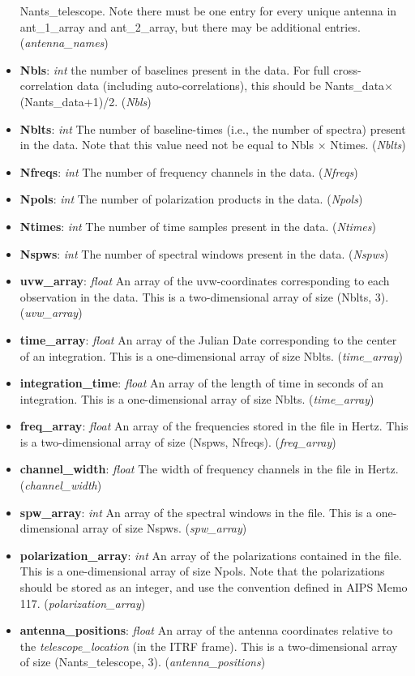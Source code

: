 \documentclass[11pt, oneside]{article}
\begin{document}
\begin{itemize}
  Nants\_telescope. Note there must be one entry for every unique antenna in
  ant\_1\_array and ant\_2\_array, but there may be additional
  entries. (\textit{antenna\_names})
\item \textbf{Nbls}: \textit{int} the number of baselines present in the
  data. For full cross-correlation data (including auto-correlations), this
  should be Nants\_data$\times$(Nants\_data+1)/2. (\textit{Nbls})
\item \textbf{Nblts}: \textit{int} The number of baseline-times (i.e., the
  number of spectra) present in the data. Note that this value need not be equal
  to Nbls $\times$ Ntimes. (\textit{Nblts})
\item \textbf{Nfreqs}: \textit{int} The number of frequency channels in the
  data. (\textit{Nfreqs})
\item \textbf{Npols}: \textit{int} The number of polarization products in the
  data. (\textit{Npols})
\item \textbf{Ntimes}: \textit{int} The number of time samples present in the
  data. (\textit{Ntimes})
\item \textbf{Nspws}: \textit{int} The number of spectral windows present in the
  data. (\textit{Nspws})
\item \textbf{uvw\_array}: \textit{float} An array of the uvw-coordinates
  corresponding to each observation in the data. This is a two-dimensional array of
  size (Nblts, 3). (\textit{uvw\_array})
\item \textbf{time\_array}: \textit{float} An array of the Julian Date
  corresponding to the center of an integration. This is a one-dimensional array
  of size Nblts. (\textit{time\_array})
\item \textbf{integration\_time}: \textit{float} An array of the length of time
  in seconds of an integration. This is a one-dimensional array of size
  Nblts. (\textit{time\_array})
\item \textbf{freq\_array}: \textit{float} An array of the frequencies stored in
  the file in Hertz. This is a two-dimensional array of size (Nspws,
  Nfreqs). (\textit{freq\_array})
\item \textbf{channel\_width}: \textit{float} The width of frequency channels in
  the file in Hertz. (\textit{channel\_width})
\item \textbf{spw\_array}: \textit{int} An array of the spectral windows in the
  file. This is a one-dimensional array of size Nspws. (\textit{spw\_array})
\item \textbf{polarization\_array}: \textit{int} An array of the polarizations
  contained in the file. This is a one-dimensional array of size Npols. Note
  that the polarizations should be stored as an integer, and use the convention
  defined in AIPS Memo 117. (\textit{polarization\_array})
\item \textbf{antenna\_positions}: \textit{float} An array of the antenna
  coordinates relative to the \textit{telescope\_location} (in the ITRF
  frame). This is a two-dimensional array of size (Nants\_telescope,
  3). (\textit{antenna\_positions})
\end{itemize}
\end{document}
